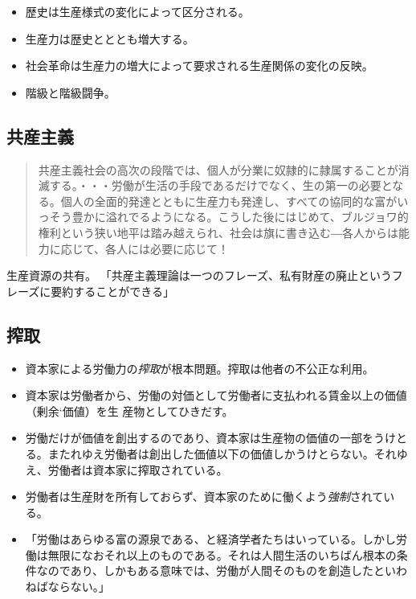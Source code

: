 \documentclass[uplatex,dvipdfmx]{jsarticle} \usepackage{mystyle}%
\begin{document}
\begin{itemize}
\item 歴史は生産様式の変化によって区分される。
\item 生産力は歴史とととも増大する。
\item 社会革命は生産力の増大によって要求される生産関係の変化の反映。
\item 階級と階級闘争。
\end{itemize}




\subsection{共産主義}

\begin{quote}
  共産主義社会の高次の段階では、個人が分業に奴隷的に隷属することが消滅する。・・・労働が生活の手段であるだけでなく、生の第一の必要となる。個人の全面的発達とともに生産力も発達し、すべての協同的な富がいっそう豊かに溢れでるようになる。こうした後にはじめて、ブルジョワ的権利という狭い地平は踏み越えられ、社会は旗に書き込む{\――}各人からは能力に応じて、各人には必要に応じて！
\end{quote}


生産資源の共有。
「共産主義理論は一つのフレーズ、私有財産の廃止というフレーズに要約することができる」



\subsection{搾取}

\begin{itemize}
\item 資本家による労働力の\emph{搾取}が根本問題。搾取は他者の不公正な利用。
\item 資本家は労働者から、労働の対価として労働者に支払われる賃金以上の価値（剰余`価値）を生
  産物としてひきだす。
\item 労働だけが価値を創出するのであり、資本家は生産物の価値の一部をうけとる。またれゆえ労働者は創出した価値以下の価値しかうけとらない。それゆえ、労働者は資本家に搾取されている。
\item 労働者は生産財を所有しておらず、資本家のために働くよう\emph{強制}されている。

\item 「労働はあらゆる富の源泉である、と経済学者たちはいっている。しかし労働は無限になおそれ以上のものである。それは人間生活のいちばん根本の条件なのであり、しかもある意味では、労働が人間そのものを創造したといわねばならない。」

\end{itemize}
\end{document}
